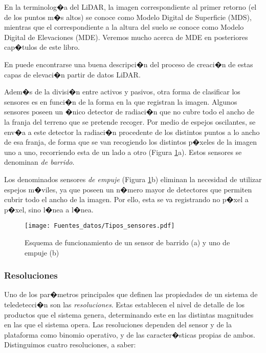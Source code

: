 En la terminolog�a del LiDAR, la imagen correspondiente al primer retorno (el de los puntos m�s altos) se conoce como Modelo Digital de Superficie (MDS), mientras que el correspondiente a la altura del suelo se conoce como Modelo Digital de Elevaciones (MDE). Veremos mucho acerca de MDE en posteriores cap�tulos de este libro. 

En \cite{Kraus2001IASPRS} puede encontrarse una buena descripci�n del proceso de creaci�n de estas capas de elevaci�n partir de datos LiDAR.

Adem�s de la divisi�n entre activos y pasivos, otra forma de clasificar los sensores es en funci�n de la forma en la que registran la imagen. Algunos sensores poseen un �nico detector de radiaci�n que no cubre todo el ancho de la franja del terreno que se pretende recoger. Por medio de espejos oscilantes, se env�a a este detector la radiaci�n procedente de los distintos puntos a lo ancho de esa franja, de forma que se van recogiendo los distintos p�xeles de la imagen uno a uno, recorriendo esta de un lado a otro (Figura \ref{Fig:Tipos_sensores}a). Estos sensores se denominan \emph{de barrido}. 

Los denominados sensores \emph{de empuje} (Figura \ref{Fig:Tipos_sensores}b) eliminan la necesidad de utilizar espejos m�viles, ya que poseen un n�mero mayor de detectores que permiten cubrir todo el ancho de la imagen. Por ello, esta se va registrando no p�xel a p�xel, sino l�nea a l�nea.


\begin{figure}[!hbt]   
\centering
\texttt{[image: Fuentes\_datos/Tipos\_sensores.pdf]}
\caption{\small Esquema de funcionamiento de un sensor de barrido (a) y uno de empuje (b)}
\label{Fig:Tipos_sensores} 
\end{figure}

\subsubsection{Resoluciones}

Uno de los par�metros principales que definen las propiedades de un sistema de teledetecci�n son las \emph{resoluciones}. Estas establecen el nivel de detalle de los productos que el sistema genera, determinando este en las distintas magnitudes en las que el sistema opera. Las resoluciones dependen del sensor y de la plataforma como binomio operativo, y de las caracter�sticas propias de ambos. Distinguimos cuatro resoluciones, a saber:

